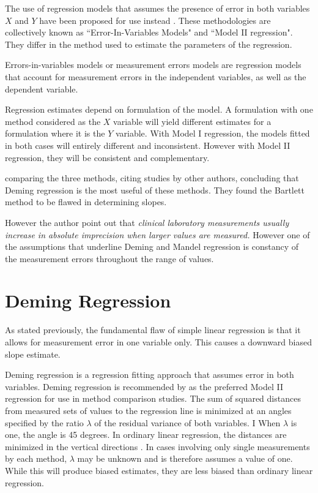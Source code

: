\documentclass[12pt, a4paper]{report}
\theoremstyle{plain}
\theoremstyle{definition}
\theoremstyle{remark}
\begin{document}
The use of regression models that assumes the presence of error in
both variables $X$ and $Y$ have been proposed for use instead
\citep{CornCoch,ludbrook97}. These methodologies are collectively
known as ``Error-In-Variables Models" and ``Model II regression". They differ in the method used to
estimate the parameters of the regression.

Errors-in-variables models or measurement errors models are regression models that account for measurement errors in the independent variables, as well as the dependent variable.


Regression estimates depend on formulation of the model. A
formulation with one method considered as the $X$ variable will
yield different estimates for a formulation where it is the $Y$
variable. With Model I regression, the models fitted in both cases
will entirely different and inconsistent. However with Model II
regression, they will be consistent and complementary.

\citet{CornCoch} comparing the three methods, citing studies by other authors, concluding that Deming regression is the most useful of these methods. They found the Bartlett method to be
flawed in determining slopes.

However the author point out that \emph{ clinical laboratory measurements usually increase in absolute imprecision when larger values are measured.} However one of the assumptions that underline Deming and Mandel regression is constancy of the measurement errors throughout the range of values.





	\section{Deming Regression}
	
	As stated previously, the fundamental flaw of simple linear regression is that it allows for measurement error in one variable only. This causes a downward biased slope estimate.
	
	Deming regression is a regression fitting approach that assumes error in both variables. Deming regression is recommended by \citet*{CornCoch} as the
	preferred Model II regression for use in method comparison studies.
	The sum of squared distances from measured sets of values to the regression line is minimized at an angles specified by the ratio $\lambda$ of the residual variance of both variables. I
	When $\lambda$ is one, the angle is 45 degrees. In ordinary linear regression, the distances are minimized in the vertical directions \citep{linnet99}.
	In cases involving only single measurements by each method, $\lambda$ may be unknown and is therefore assumes a value of one. While this will produce biased estimates, they are less biased than ordinary linear regression.
	
\end{document}

